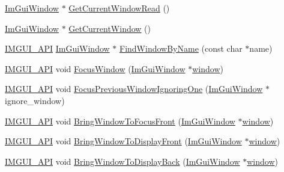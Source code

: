 \begin{DoxyCompactItemize}
\item 
\mbox{\hyperlink{struct_im_gui_window}{Im\+Gui\+Window}} $\ast$ \mbox{\hyperlink{namespace_im_gui_a408f9ddac92f8629a7e273ced5f8c3aa}{Get\+Current\+Window\+Read}} ()
\item 
\mbox{\hyperlink{struct_im_gui_window}{Im\+Gui\+Window}} $\ast$ \mbox{\hyperlink{namespace_im_gui_a7ceba68eca2b09fb6bf1ad88037e6203}{Get\+Current\+Window}} ()
\item 
\mbox{\hyperlink{imgui_8h_a43829975e84e45d1149597467a14bbf5}{I\+M\+G\+U\+I\+\_\+\+A\+PI}} \mbox{\hyperlink{struct_im_gui_window}{Im\+Gui\+Window}} $\ast$ \mbox{\hyperlink{namespace_im_gui_abca25f22c02e73d5eb2e9c72c4557813}{Find\+Window\+By\+Name}} (const char $\ast$name)
\item 
\mbox{\hyperlink{imgui_8h_a43829975e84e45d1149597467a14bbf5}{I\+M\+G\+U\+I\+\_\+\+A\+PI}} void \mbox{\hyperlink{namespace_im_gui_ade4c08e7e7ad7bbfa4835248f5f3a7c6}{Focus\+Window}} (\mbox{\hyperlink{struct_im_gui_window}{Im\+Gui\+Window}} $\ast$\mbox{\hyperlink{radar_8cpp_a80de27bd7dc4e2b2ad3d5895b97a70f0}{window}})
\item 
\mbox{\hyperlink{imgui_8h_a43829975e84e45d1149597467a14bbf5}{I\+M\+G\+U\+I\+\_\+\+A\+PI}} void \mbox{\hyperlink{namespace_im_gui_afbd916bd6d921233e57bfdf1309dae65}{Focus\+Previous\+Window\+Ignoring\+One}} (\mbox{\hyperlink{struct_im_gui_window}{Im\+Gui\+Window}} $\ast$ignore\+\_\+window)
\item 
\mbox{\hyperlink{imgui_8h_a43829975e84e45d1149597467a14bbf5}{I\+M\+G\+U\+I\+\_\+\+A\+PI}} void \mbox{\hyperlink{namespace_im_gui_affe95a2dc969f0d15fbd4b588c94ac1a}{Bring\+Window\+To\+Focus\+Front}} (\mbox{\hyperlink{struct_im_gui_window}{Im\+Gui\+Window}} $\ast$\mbox{\hyperlink{radar_8cpp_a80de27bd7dc4e2b2ad3d5895b97a70f0}{window}})
\item 
\mbox{\hyperlink{imgui_8h_a43829975e84e45d1149597467a14bbf5}{I\+M\+G\+U\+I\+\_\+\+A\+PI}} void \mbox{\hyperlink{namespace_im_gui_a1f7b95f36d03751c928af7b1b745e959}{Bring\+Window\+To\+Display\+Front}} (\mbox{\hyperlink{struct_im_gui_window}{Im\+Gui\+Window}} $\ast$\mbox{\hyperlink{radar_8cpp_a80de27bd7dc4e2b2ad3d5895b97a70f0}{window}})
\item 
\mbox{\hyperlink{imgui_8h_a43829975e84e45d1149597467a14bbf5}{I\+M\+G\+U\+I\+\_\+\+A\+PI}} void \mbox{\hyperlink{namespace_im_gui_a34d2363f631f1df5ab1a2a131ab98fa7}{Bring\+Window\+To\+Display\+Back}} (\mbox{\hyperlink{struct_im_gui_window}{Im\+Gui\+Window}} $\ast$\mbox{\hyperlink{radar_8cpp_a80de27bd7dc4e2b2ad3d5895b97a70f0}{window}})
\item 

\end{DoxyCompactItemize}
